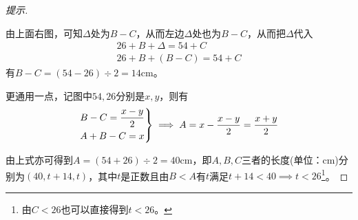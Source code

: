 \begin{proof}[提示]
\begin{center}
  \end{center}
  由上面右图，可知$\Delta$处为$B-C$，从而左边$\Delta$处也为$B-C$，从而把$\Delta$代入
  \begin{align*}
    26 + B + \Delta = 54 + C\\
    26 + B + (B-C) = 54 + C
  \end{align*}
  有$B-C= (54-26)\div2=14$cm。

  更通用一点，记图中$54,26$分别是$x,y$，则有
  \begin{align*}
    \begin{drcases}             %
      B-C=\frac{x-y}{2}\\
      A+B-C=x
    \end{drcases}
    \implies A = x - \frac{x-y}{2} = \frac{x+y}{2}
  \end{align*}

  由上式亦可得到$A=(54+26)\div2=40$cm，即$A,B,C$三者的长度(单位：cm)分别为$(40,t+14,t)$，其中$t$是正数且由$B<A$有$t$满足$t+14<40\implies t<26$\footnote{由$C<26$也可以直接得到$t<26$。}。
\end{proof}

